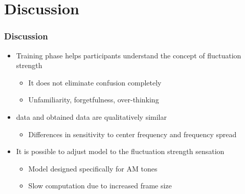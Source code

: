 \documentclass{beamer}
\begin{document}
\section{Discussion}
\begin{frame}
  \frametitle{Discussion}
  \begin{itemize}
    \item<1-> Training phase helps participants understand the concept of
      fluctuation strength
    \begin{itemize}
      \item<2-> It does not eliminate confusion completely
      \item<3-> Unfamiliarity, forgetfulness, over-thinking
    \end{itemize}
    \item<4-> \citeauthor{Fastl2007Psychoacoustics} data and obtained data are
      qualitatively similar
    \begin{itemize}
      \item<5-> Differences in sensitivity to center frequency and frequency
        spread
    \end{itemize}
    \item<6-> It is possible to adjust \citeauthor{daniel1997psychoacoustical}
      model to the fluctuation strength sensation
    \begin{itemize}
      \item<7-> Model designed specifically for AM tones
      \item<8-> Slow computation due to increased frame size
    \end{itemize}
  \end{itemize}
\end{frame}
\end{document}
